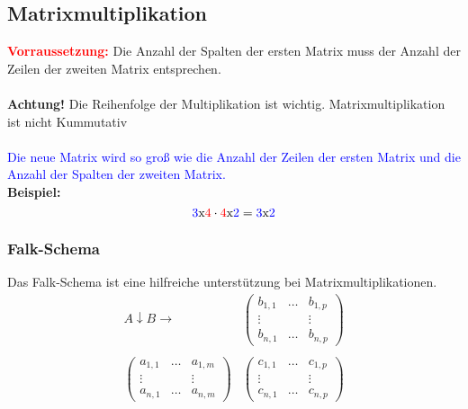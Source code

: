 \documentclass[12pt,a4paper]{article}
\begin{document}
\subsection{Matrixmultiplikation}
\textbf{\textcolor{red}{Vorraussetzung:}} Die Anzahl der Spalten der ersten Matrix muss der Anzahl der Zeilen der zweiten Matrix entsprechen. \\ \\
\textbf{Achtung!} Die Reihenfolge der Multiplikation ist wichtig. Matrixmultiplikation ist nicht Kummutativ\\ \\
\textcolor{blue}{Die neue Matrix wird so groß wie die Anzahl der Zeilen der ersten Matrix und die Anzahl der Spalten der zweiten Matrix.} \\
\textbf{Beispiel:}
\[
\textcolor{blue}{3}\text{x}\textcolor{red}{4} \cdot \textcolor{red}{4}\text{x}\textcolor{blue}{2} = \textcolor{blue}{3}\text{x}\textcolor{blue}{2}
\]
\subsubsection{Falk-Schema}
Das Falk-Schema ist eine hilfreiche unterstützung bei Matrixmultiplikationen. \\
\[
\begin{matrix}
A \downarrow B \rightarrow  & \begin{pmatrix}
       b_{1,1} & \dots & b_{1,p} \\
         \vdots &  & \vdots \\
         b_{n, 1} & \dots & b_{n, p}
        \end{pmatrix} \\ \\
\begin{pmatrix}
a_{1,1} & \dots & a_{1,m} \\
\vdots &  & \vdots \\
a_{n,1} & \dots & a_{n,m}
\end{pmatrix} & \begin{pmatrix}
c_{1,1} & \dots & c_{1,p} \\
\vdots &  & \vdots \\
c_{n,1} & \dots & c_{n,p}
\end{pmatrix}
\end{matrix}
\]
\newpage
\end{document}
